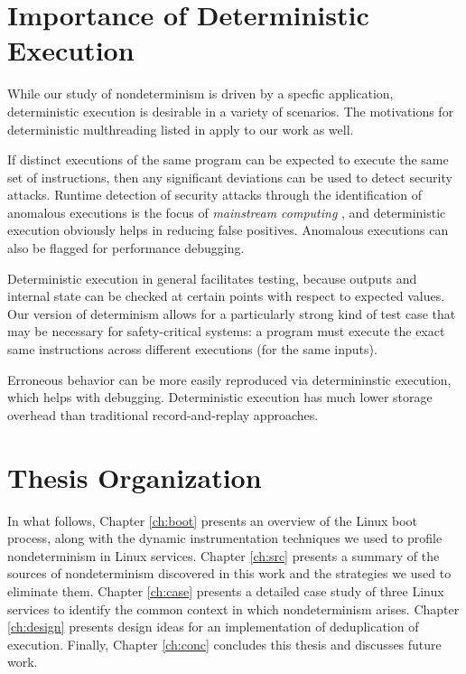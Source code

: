 \section{Importance of Deterministic Execution}
While our study of nondeterminism is driven by a specfic application,
deterministic execution is desirable in a variety of scenarios.
The motivations for deterministic multhreading listed in
\cite{marek2011scaling, patil2010pinplay} apply to our work as well. \newline

If distinct executions of the same program can be
expected to execute the same set of instructions, then
any significant deviations can be used to detect security
attacks. Runtime detection of security attacks through the
identification of anomalous executions is the focus of \emph{mainstream computing} \cite{stephenson2010mainstream},
and deterministic execution obviously helps in reducing false
positives. 
Anomalous executions can also be flagged for performance
debugging. \newline

Deterministic execution in general facilitates testing,
because outputs and internal state can be checked at 
certain points with respect to expected values. Our version
of determinism allows for a particularly strong kind
of test case that may be necessary for safety-critical 
systems: a program 
must execute the exact same instructions 
across different executions (for the same inputs). \newline 

Erroneous behavior can be more easily reproduced
via determininstic execution, which
helps with debugging. Deterministic
execution has much lower storage overhead
than traditional record-and-replay approaches. 

\section{Thesis Organization} 
In what follows, Chapter \ref{ch:boot} presents an overview of
the Linux boot process, along with the dynamic instrumentation
techniques we used to profile nondeterminism in Linux services.
Chapter \ref{ch:src} presents a summary of the sources of nondeterminism
discovered in this work and the strategies we used
to eliminate them. 
Chapter \ref{ch:case} presents a detailed case study of three Linux services
to identify the common context in which nondeterminism arises.
Chapter \ref{ch:design} presents design ideas for an implementation of deduplication of execution.
Finally, Chapter \ref{ch:conc} concludes this thesis and discusses future work.
